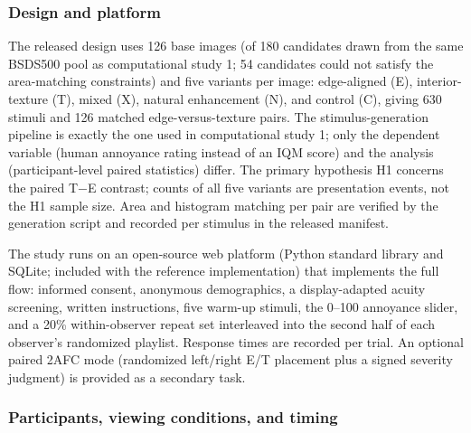 \documentclass[5p,times,twocolumn]{elsarticle}
\begin{document}
\subsubsection{Design and platform}
\label{sec:stimuli-design}

The released design uses 126 base images (of 180 candidates drawn from the
same BSDS500 pool as computational study 1; 54 candidates could not satisfy
the area-matching constraints) and five variants per image:
edge-aligned (E), interior-texture (T), mixed (X), natural enhancement (N),
and control (C), giving 630 stimuli and 126 matched edge-versus-texture
pairs. The stimulus-generation pipeline is exactly the one used in
computational study 1; only the dependent variable (human annoyance rating
instead of an IQM score) and the analysis (participant-level paired
statistics) differ. The primary hypothesis H1 concerns the paired T$-$E
contrast; counts of all five variants are presentation events, not the H1
sample size. Area and histogram matching per pair are verified by the
generation script and recorded per stimulus in the released manifest.

The study runs on an open-source web platform (Python standard library and
SQLite; included with the reference implementation) that implements the full
flow: informed consent, anonymous demographics, a display-adapted acuity
screening, written instructions, five warm-up stimuli, the 0--100 annoyance
slider, and a 20\% within-observer repeat set interleaved into the second
half of each observer's randomized playlist. Response times are recorded per
trial. An optional paired 2AFC mode (randomized left/right E/T placement plus
a signed severity judgment) is provided as a secondary task.

\subsubsection{Participants, viewing conditions, and timing}
\end{document}
